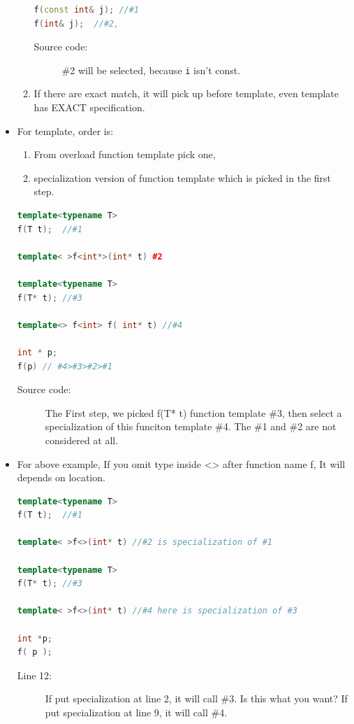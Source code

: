 \documentclass[a4paper,11pt,twoside]{book}
\begin{document}
\begin{itemize}
\begin{enumerate}
\begin{lstlisting}[frame=single, language=c++]
f(const int& j); //#1
f(int& j);  //#2, 
\end{lstlisting}
\begin{description}
	\item[Source code:] \#2 will be selected, because \texttt{i} isn't const.
\end{description}
		\item If there are exact match, it will pick up before template, even template has EXACT specification.
\end{enumerate}

	\item For template, order is:
	\begin{enumerate}
		\item From overload function template pick one,
		\item specialization version of function template which is picked in the first step.
	\end{enumerate}

\begin{lstlisting}[frame=single, language=c++]
template<typename T>
f(T t);  //#1

template< >f<int*>(int* t) #2

template<typename T>
f(T* t); //#3

template<> f<int> f( int* t) //#4

int * p;
f(p) // #4>#3>#2>#1
\end{lstlisting}
\begin{description}
	\item[Source code:] The First step, we picked f(T* t) function template \#3, then select a specialization of this funciton template \#4. The \#1 and \#2 are not considered at all.
\end{description}

\item For above example, If you omit type inside <> after function name f, It will depends on location.
\begin{lstlisting}[frame=single, language=c++]
template<typename T>
f(T t);  //#1

template< >f<>(int* t) //#2 is specialization of #1

template<typename T>
f(T* t); //#3

template< >f<>(int* t) //#4 here is specialization of #3

int *p; 
f( p ); 
\end{lstlisting}
\begin{description}
	\item[Line 12:] If put specialization at line 2, it will call \#3. Is this what you want? If put specialization at line 9, it will call \#4.
\end{description}


\end{itemize}
\end{document}
